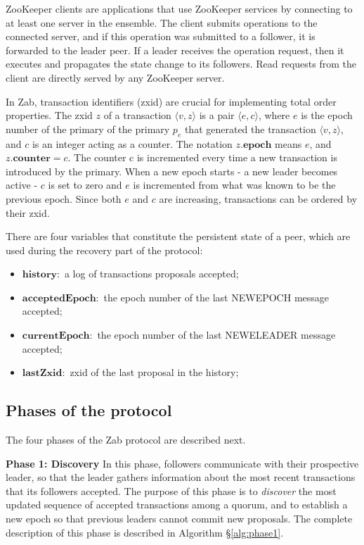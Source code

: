 \documentclass[10pt,onecolumn]{article}
\begin{document}
ZooKeeper clients are applications that use ZooKeeper services by connecting to at least one server in the ensemble. The client submits operations to the connected server, and if this operation was submitted to a follower, it is forwarded to the leader peer. If a leader receives the operation request, then it executes and propagates the state change to its followers. Read requests from the client are directly served by any ZooKeeper server.

In Zab, transaction identifiers (zxid) are crucial for implementing total order properties. The zxid $z$ of a transaction $\langle v, z \rangle$ is a pair $\langle e, c \rangle$, where $e$ is the epoch number of the primary of the primary $p_e$ that generated the transaction $\langle v,z \rangle$, and $c$ is an integer acting as a counter. The notation $z.\mathbf{epoch}$ means $e$, and $z.\mathbf{counter} = c$. The counter c is incremented every time a new transaction is introduced by the primary. When a new epoch starts - a new leader becomes active - $c$ is set to zero and $e$ is incremented from what was known to be the previous epoch. Since both $e$ and $c$ are increasing, transactions can be ordered by their zxid.

There are four variables that constitute the persistent state of a peer, which are used during the recovery part of the protocol:
\begin{itemize}
    \item $\mathbf{history}:$ a log of transactions proposals accepted;
    \item $\mathbf{acceptedEpoch}:$ the epoch number of the last NEWEPOCH message accepted;
    \item $\mathbf{currentEpoch}:$ the epoch number of the last NEWELEADER message accepted;
    \item $\mathbf{lastZxid}:$ zxid of the last proposal in the history;
\end{itemize}

\subsection{Phases of the protocol} \label{sec:phases}
The four phases of the Zab protocol are described next.

\textbf{Phase 1: Discovery} In this phase, followers communicate with their prospective leader, so that the leader gathers information about the most recent transactions that its followers accepted. The purpose of this phase is to \textit{discover} the most updated sequence of accepted transactions among a quorum, and to establish a new epoch so that previous leaders cannot commit new proposals.
The complete description of this phase is described in Algorithm \S\ref{alg:phase1}.
\end{document}
